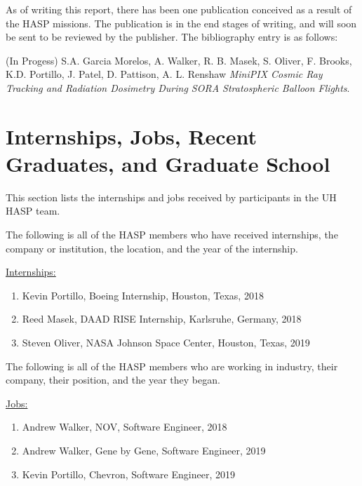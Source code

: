 \begin{appendices}
  \noindent As of writing this report, there has been one publication conceived as a result of the HASP missions.
  The publication is in the end stages of writing, and will soon be sent to be reviewed by the publisher.
  The bibliography entry is as follows:

  \noindent (In Progess) S.A. Garcia Morelos, A. Walker, R. B. Masek, S. Oliver, F. Brooks, K.D. Portillo, J. Patel, D. Pattison, A. L. Renshaw \textit{MiniPIX Cosmic Ray Tracking and Radiation Dosimetry During SORA Stratospheric Balloon Flights}.
  
  \section{Internships, Jobs, Recent Graduates, and Graduate School}
  \noindent This section lists the internships and jobs received by participants in the UH HASP team.
  
  \vspace{0.5cm}
  
  \noindent The following is all of the HASP members who have received internships, the company or institution, the location, and the year of the internship.
  
  \vspace{0.25cm}
  \noindent\underline{Internships:}
  \begin{enumerate}[leftmargin=3\parindent]
  \item Kevin Portillo, Boeing Internship, Houston, Texas, 2018
  \item Reed Masek, DAAD RISE Internship, Karlsruhe, Germany, 2018
  \item Steven Oliver, NASA Johnson Space Center, Houston, Texas, 2019
  \end{enumerate}

  \vspace{0.5cm}
  
  \noindent The following is all of the HASP members who are working in industry, their company, their position, and the year they began.

  \vspace{0.25cm}
  \noindent\underline{Jobs:}
  \begin{enumerate}[leftmargin=3\parindent]
  \item Andrew Walker, NOV, Software Engineer, 2018
  \item Andrew Walker, Gene by Gene, Software Engineer, 2019
  \item Kevin Portillo, Chevron, Software Engineer, 2019
  \end{enumerate}


\end{appendices}
